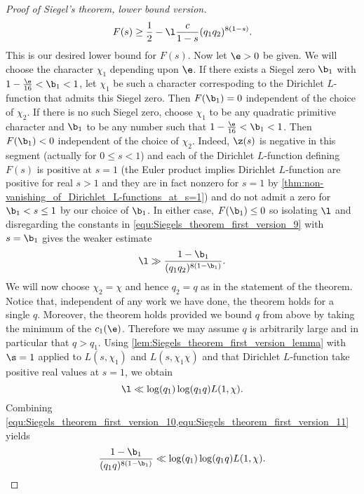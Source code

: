 \begin{proof}[Proof of Siegel's theorem, lower bound version]
        \begin{equation}\label{equ:Siegels_theorem_first_version_9}
          F(s) \ge \frac{1}{2}-\l\frac{c}{1-s}(q_{1}q_{2})^{8(1-s)}.
        \end{equation}
        This is our desired lower bound for $F(s)$. Now let $\e > 0$ be given. We will choose the character $\chi_{1}$ depending upon $\e$. If there exists a Siegel zero $\b_{1}$ with $1-\frac{\e}{16} < \b_{1} < 1$, let $\chi_{1}$ be such a character correspoding to the Dirichlet $L$-function that admits this Siegel zero. Then $F(\b_{1}) = 0$ independent of the choice of $\chi_{2}$. If there is no such Siegel zero, choose $\chi_{1}$ to be any quadratic primitive character and $\b_{1}$ to be any number such that $1-\frac{\e}{16} < \b_{1} < 1$. Then $F(\b_{1}) < 0$ independent of the choice of $\chi_{2}$. Indeed, $\z(s)$ is negative in this segment (actually for $0 \le s < 1$) and each of the Dirichlet $L$-function defining $F(s)$ is positive at $s = 1$ (the Euler product implies Dirichlet $L$-function are positive for real $s > 1$ and they are in fact nonzero for $s = 1$ by \cref{thm:non-vanishing_of_Dirichlet_L-functions_at_s=1}) and do not admit a zero for $\b_{1} < s \le 1$ by our choice of $\b_{1}$. In either case, $F(\b_{1}) \le 0$ so isolating $\l$ and disregarding the constants in \cref{equ:Siegels_theorem_first_version_9} with $s = \b_{1}$ gives the weaker estimate
        \begin{equation}\label{equ:Siegels_theorem_first_version_10}
          \l \gg \frac{1-\b_{1}}{(q_{1}q_{2})^{8(1-\b_{1})}}.
        \end{equation}
        We will now choose $\chi_{2} = \chi$ and hence $q_{2} = q$ as in the statement of the theorem. Notice that, independent of any work we have done, the theorem holds for a single $q$. Moreover, the theorem holds provided we bound $q$ from above by taking the minimum of the $c_{1}(\e)$. Therefore we may assume $q$ is arbitrarily large and in particular that $q > q_{1}$. Using \cref{lem:Siegels_theorem_first_version_lemma} with $\s = 1$ applied to $L(s,\chi_{1})$ and $L(s,\chi_{1}\chi)$ and that Dirichlet $L$-function take positive real values at $s = 1$, we obtain
        \begin{equation}\label{equ:Siegels_theorem_first_version_11}
          \l \ll \log(q_{1})\log(q_{1}q)L(1,\chi).
        \end{equation}
        Combining \cref{equ:Siegels_theorem_first_version_10,equ:Siegels_theorem_first_version_11} yields
        \[
          \frac{1-\b_{1}}{(q_{1}q)^{8(1-\b_{1})}} \ll \log(q_{1})\log(q_{1}q)L(1,\chi).
\]
\end{proof}
